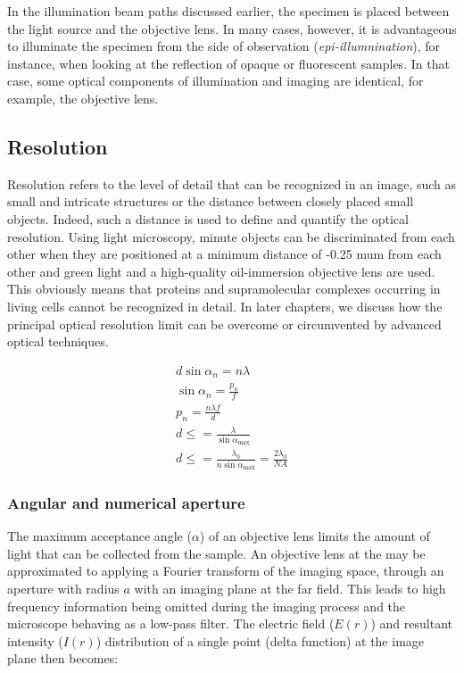 In the illumination beam paths discussed earlier, the specimen is placed between the light source and the objective lens.
In many cases, however, it is advantageous to illuminate the specimen from the side of observation (\emph{epi-illumnination}), for instance, when looking at the reflection of opaque or fluorescent samples.
In that case, some optical components of illumination and imaging are identical, for example, the objective lens. %


\subsection{Resolution}


Resolution refers to the level of detail that can be recognized in an image, such as small and intricate structures or the distance between closely placed small objects.
Indeed, such a distance is used to define and quantify the optical resolution.
Using light microscopy, minute objects can be discriminated from each other when they are positioned at a minimum distance of -0.25 mum from each other and green light and a high-quality oil-immersion objective lens are used.
This obviously means that proteins and supramolecular complexes occurring in living cells cannot be recognized in detail.
In later chapters, we discuss how the principal optical resolution limit can be overcome or circumvented by advanced optical techniques.

%

\begin{align}
    d \sin \alpha_n = n \lambda \\
    \sin\alpha_n = \frac{p_n}{f} \\
    p_n = \frac{n\lambda f}{d} \\
    d \le = \frac{\lambda}{\sin\alpha_{\text{max}}} \\
    d \le = \frac{\lambda_0}{n\sin\alpha_{\text{max}}} = \frac{2\lambda_0}{NA}
\end{align}

\subsubsection{Angular and numerical aperture}

The maximum acceptance angle ($\alpha$) of an objective lens limits the amount of light that can be collected from the sample.
An objective lens at the may be approximated to applying a Fourier transform of the imaging space, through an aperture with radius $a$ with an imaging plane at the far field.
This leads to high frequency information being omitted during the imaging process and the microscope behaving as a low-pass filter.
The electric field ($E(r)$) and resultant intensity ($I(r)$) distribution of a single point (delta function) at the image plane then becomes:

